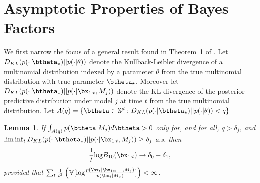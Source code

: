 \documentclass[11pt]{article}
\def\log{{\rm log}}
\newtheorem{lemma}{Lemma}[section]
\begin{document}
\section{Asymptotic Properties of Bayes Factors}
\label{app:asymptotics}
We first narrow the focus of a general result found in Theorem~1 of \cite{walker}.
Let $D_{KL}(p(\cdot|\btheta_\star)||p(\cdot|\theta) )$ denote the Kullback-Leibler divergence of a multinomial distribution indexed by a parameter $\theta$ from the true multinomial distribution with true parameter $\btheta_{\star}$.
Moreover let $D_{KL}(p(\cdot|\btheta_\star)||p(\cdot|\bx_{1:t}, M_j) )$ denote the KL divergence of the posterior predictive distribution under model $j$ at time $t$ from the true multinomial distribution.
Let $A(q) = \lbrace \btheta \in \mathbb{S}^d : D_{KL}(p(\cdot|\btheta_\star)||p(\cdot|\theta) ) < q \rbrace$
\begin{lemma}
  \label{lemma:walker}
  If $\int_{A(q)} p(\btheta|M_j) d\btheta > 0$ only for, and for all, $q > \delta_j$, and $\lim \inf_t D_{KL}(p(\cdot|\btheta_\star)||p(\cdot|\bx_{1:t}, M_j) ) \geq \delta_j$ a.s.
then
  \begin{equation}
    \label{eq:bayes_factor_convergence}
    \frac{1}{t} \log B_{10}(\bx_{1:t}) \rightarrow \delta_0 - \delta_1,
  \end{equation}
  provided that $\sum_t \frac{1}{t^2} \left( \mathbb{V}[\log \frac{p(\bx_t|\bx_{1:t-1},M_j)}{p(\bx_t|M_\star )}]\right) < \infty$.
\end{lemma}
\end{document}
